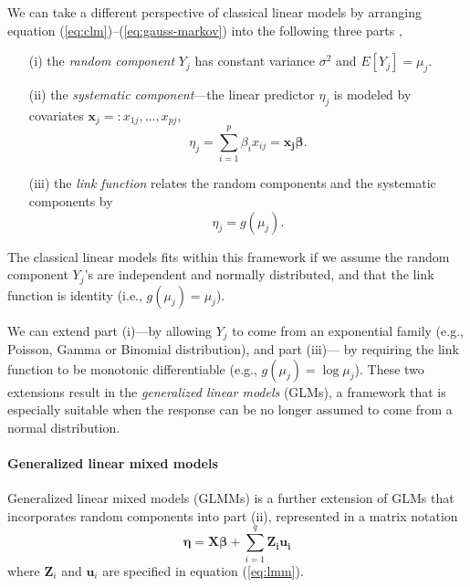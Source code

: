 We can take a different perspective of classical linear models by arranging equation
(\ref{eq:clm})--(\ref{eq:gauss-markov}) into the following three parts \citep[Chapter
2]{mccullagh1989generalized}, 
\begin{enumerate}
	\item[(i)] the \textit{random component} $Y_j$ has constant variance $\sigma^2$ and
	$E[ Y_j]= \mu_j$.
	\item[(ii)] the \textit{systematic component}---the linear predictor $\eta_j$ is modeled by
	covariates $\bm x_j =: x_{1j},\ldots, x_{pj}$, 
	\begin{equation}\label{eq:part2}
		\eta_j = \sum_{i=1}^p\beta_i x_{ij}=\bm {x_j\beta}.
	\end{equation}
	\item[(iii)] the \textit{link function} relates the random components and the systematic
	components by 
	\begin{equation}\label{eq:part3}
		\eta_j = g(\mu_j).
	\end{equation}
\end{enumerate}
The classical linear models fits within this framework if we assume the random component $Y_j$'s
are independent and normally distributed, and that the link function is identity (i.e., $g(\mu_j)=
\mu_j$).

We can extend part (i)---by allowing $Y_j$ to come from an exponential family (e.g., Poisson,
Gamma or Binomial distribution), and part (iii)--- by requiring the link function to be monotonic
differentiable (e.g., $g(\mu_j)= \log \mu_j$). These two extensions result in the
\textit{generalized linear models} (GLMs), a framework that is especially suitable when the response
can be no longer assumed to come from a normal distribution.


\paragraph{Generalized linear mixed models}\label{para:glmm}
Generalized linear mixed models (GLMMs) is a further extension of GLMs that incorporates random
components into part (ii), represented in a matrix notation
\begin{equation}\label{eq:q5}
	\bm \eta = \bm {X\beta} + \sum_{i=1}^q\bm {Z_iu_i}
\end{equation}
where  $\bm Z_i$ and $\bm u_i$ are specified in equation (\ref{eq:lmm}). 

